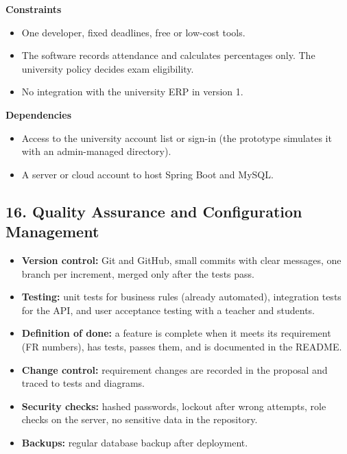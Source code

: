 \documentclass[
  11pt,
]{article}
\providecommand{\tightlist}{%
  \setlength{\itemsep}{0pt}\setlength{\parskip}{0pt}}
\begin{document}
\textbf{Constraints}

\begin{itemize}
\tightlist
\item
  One developer, fixed deadlines, free or low-cost tools.
\item
  The software records attendance and calculates percentages only. The
  university policy decides exam eligibility.
\item
  No integration with the university ERP in version 1.
\end{itemize}

\textbf{Dependencies}

\begin{itemize}
\tightlist
\item
  Access to the university account list or sign-in (the prototype
  simulates it with an admin-managed directory).
\item
  A server or cloud account to host Spring Boot and MySQL.
\end{itemize}

\hypertarget{quality-assurance-and-configuration-management}{%
\subsection{16. Quality Assurance and Configuration
Management}\label{quality-assurance-and-configuration-management}}

\begin{itemize}
\tightlist
\item
  \textbf{Version control:} Git and GitHub, small commits with clear
  messages, one branch per increment, merged only after the tests pass.
\item
  \textbf{Testing:} unit tests for business rules (already automated),
  integration tests for the API, and user acceptance testing with a
  teacher and students.
\item
  \textbf{Definition of done:} a feature is complete when it meets its
  requirement (FR numbers), has tests, passes them, and is documented in
  the README.
\item
  \textbf{Change control:} requirement changes are recorded in the
  proposal and traced to tests and diagrams.
\item
  \textbf{Security checks:} hashed passwords, lockout after wrong
  attempts, role checks on the server, no sensitive data in the
  repository.
\item
  \textbf{Backups:} regular database backup after deployment.
\end{itemize}
\end{document}
